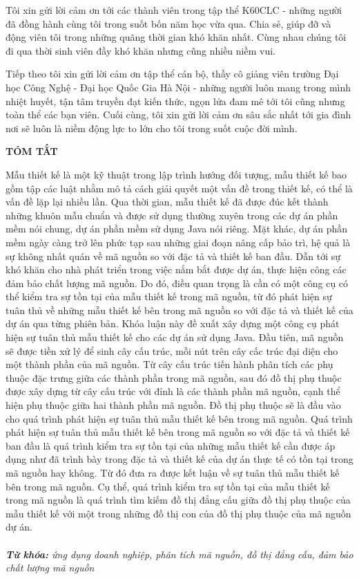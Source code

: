 \documentclass[12pt]{report}
\begin{document}
\noindent Tôi xin gửi lời cảm ơn tới các thành viên trong tập thể K60CLC - những người đã đồng hành cùng tôi trong suốt bốn năm học vừa qua. Chia sẻ, giúp đỡ và động viên tôi trong những quãng thời gian khó khăn nhất. Cùng nhau chúng tôi đi qua thời sinh viên đầy khó khăn nhưng cũng nhiều niềm vui. 

\noindent Tiếp theo tôi xin gửi lời cảm ơn tập thể cán bộ, thầy cô giảng viên trường Đại học Công Nghệ - Đại học Quốc Gia Hà Nội - những người luôn mang trong mình nhiệt huyết, tận tâm truyền đạt kiến thức, ngọn lửa đam mê tới tôi cũng nhưng toàn thể các bạn viên. Cuối cùng, tôi xin gửi lời cảm ơn sâu sắc nhất tới gia đình nơi sẽ luôn là niềm động lực to lớn cho tôi trong suốt cuộc đời mình.

	
\newpage
\begin{center}
	\textbf{\large TÓM TẮT}
\end{center}
Mẫu thiết kế là một kỹ thuật trong lập trình hướng đối tượng, mẫu thiết kế bao gồm tập các luật nhằm mô tả cách giải quyết một vấn đề trong thiết kế, có thể là vấn đề lặp lại nhiều lần. Qua thời gian, mẫu thiết kế đã được đúc kết thành những khuôn mẫu chuẩn và được sử dụng thường xuyên trong các dự án phần mềm nói chung, dự án phần mềm sử dụng Java nói riêng. Mặt khác, dự án phần mềm ngày càng trở lên phức tạp sau những giai đoạn nâng cấp bảo trì, hệ quả là sự không nhất quán về mã nguồn so với đặc tả và thiết kế ban đầu. Dẫn tới sự khó khăn cho nhà phát triển trong việc nắm bắt được dự án, thực hiện công các đảm bảo chất lượng mã nguồn. Do đó, điều quan trọng là cần có một công cụ có thể kiểm tra sự tồn tại của mẫu thiết kế trong mã nguồn, từ đó phát hiện sự tuân thủ về những mẫu thiết kế bên trong mã nguồn so với đặc tả và thiết kế của dự án qua từng phiên bản. Khóa luận này đề xuất xây dựng một công cụ phát hiện sự tuân thủ mẫu thiết kế cho các dự án sử dụng Java. Đầu tiên, mã nguồn sẽ được tiền xử lý để sinh cây cấu trúc, mỗi nút trên cây cấc trúc đại diện cho một thành phần của mã nguồn. Từ cây cấu trúc tiến hành phân tích các phụ thuộc đặc trưng giữa các thành phần trong mã nguồn, sau đó đồ thị phụ thuộc được xây dựng từ cây cấu trúc với đỉnh là các thành phần mã nguồn, cạnh thể hiện phụ thuộc giữa hai thành phần mã nguồn. Đồ thị phụ thuộc sẽ là đầu vào cho quá trình phát hiện sự tuân thủ mẫu thiết kế bên trong mã nguồn. Quá trình phát hiện sự tuân thủ mẫu thiết kế bên trong mã nguồn so với đặc tả và thiết kế ban đầu là quá trình kiểm tra sự tồn tại của những mẫu thiết kế cần được áp dụng như đã trình bày trong đặc tả và thiết kế của dự án thực tế có tồn tại trong mã nguồn hay không. Từ đó đưa ra được kết luận về sự tuân thủ mẫu thiết kế bên trong mã nguồn. Cụ thể, quá trình kiểm tra sự tồn tại của mẫu thiết kế trong mã nguồn là quá trình tìm kiếm đồ thị đẳng cấu giữa đồ thị phụ thuộc của mẫu thiết kế với một trong những đồ thị con của đồ thị phụ thuộc của mã nguồn dự án.\\\\
\noindent \textit{\textbf{Từ khóa:} ứng dụng doanh nghiệp, phân tích mã nguồn, đồ thị đẳng cấu, đảm bảo chất lượng mã nguồn}
\end{document}
